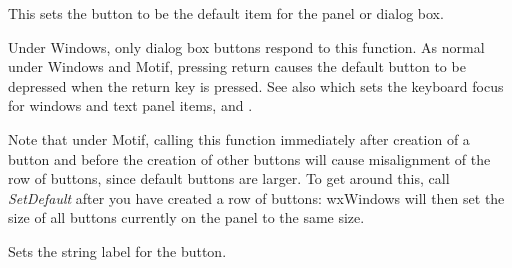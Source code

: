 \label{wxbuttonsetdefault}


This sets the button to be the default item for the panel or dialog
box.


Under Windows, only dialog box buttons respond to this function.  As
normal under Windows and Motif, pressing return causes the default button to
be depressed when the return key is pressed. See also \rtfsp
which sets the keyboard focus for windows and text panel items,\rtfsp
and .

Note that under Motif, calling this function immediately after
creation of a button and before the creation of other buttons
will cause misalignment of the row of buttons, since default
buttons are larger. To get around this, call {\it SetDefault}\rtfsp
after you have created a row of buttons: wxWindows will
then set the size of all buttons currently on the panel to
the same size.

\label{wxbuttonsetlabel}


Sets the string label for the button.





